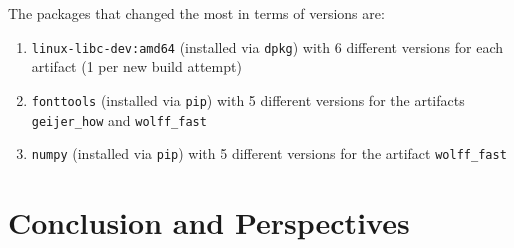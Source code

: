 \documentclass[sigconf,natbib=false]{acmart}
\begin{document}
The packages that changed the most in terms of versions are:
\begin{enumerate}
\item \texttt{linux-libc-dev:amd64} (installed via \texttt{dpkg}) with 6 different versions for each artifact (1 per new build attempt)
\item \texttt{fonttools} (installed via \texttt{pip}) with 5 different versions for the artifacts \texttt{geijer\_how} and \texttt{wolff\_fast}
\item \texttt{numpy} (installed via \texttt{pip}) with 5 different versions for the artifact \texttt{wolff\_fast}
\end{enumerate}


\section{Conclusion and Perspectives}\label{sec:conclusion}
\end{document}
